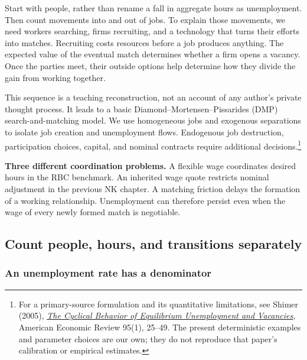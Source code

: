 Start with people, rather than rename a fall in aggregate hours as unemployment.
Then count movements into and out of jobs. To explain those movements, we need
workers searching, firms recruiting, and a technology that turns their efforts
into matches. Recruiting costs resources before a job produces anything.
The expected value of the eventual match determines whether a firm opens a
vacancy. Once the parties meet, their outside options help determine how they
divide the gain from working together.

This sequence is a teaching reconstruction, not an account of any author's
private thought process. It leads to a basic Diamond--Mortensen--Pissarides
(DMP) search-and-matching model. We use homogeneous jobs and exogenous
separations to isolate job creation and unemployment flows. Endogenous job
destruction, participation choices, capital, and nominal contracts require
additional decisions.\footnote{For a primary-source formulation and its
quantitative limitations, see Shimer (2005),
\href{https://home.uchicago.edu/~shimer/wp/published/uv.pdf}{\textit{The Cyclical
Behavior of Equilibrium Unemployment and Vacancies}}, American Economic Review
95(1), 25--49. The present deterministic examples and parameter choices are
our own; they do not reproduce that paper's calibration or empirical estimates.}

\begin{greenblock}
\textbf{Three different coordination problems.}
A flexible wage coordinates desired hours in the RBC benchmark. An inherited
wage quote restricts nominal adjustment in the previous NK chapter. A matching
friction delays the formation of a working relationship. Unemployment can
therefore persist even when the wage of every newly formed match is negotiable.
\end{greenblock}

\subsection{Count people, hours, and transitions separately}

\subsubsection{An unemployment rate has a denominator}

